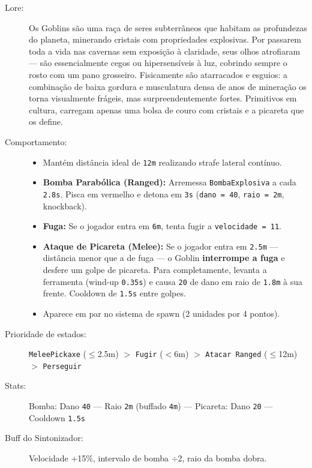 \documentclass[a4paper,12pt]{report}
\begin{document}
\begin{description}
    \item[Lore:] Os Goblins são uma raça de seres subterrâneos que habitam as profundezas do planeta, minerando cristais com propriedades explosivas. Por passarem toda a vida nas cavernas sem exposição à claridade, seus olhos atrofiaram --- são essencialmente cegos ou hipersensíveis à luz, cobrindo sempre o rosto com um pano grosseiro. Fisicamente são atarracados e esguios: a combinação de baixa gordura e musculatura densa de anos de mineração os torna visualmente frágeis, mas surpreendentemente fortes. Primitivos em cultura, carregam apenas uma bolsa de couro com cristais e a picareta que os define.
    \item[Comportamento:]
    \begin{itemize}
        \item Mantém distância ideal de \texttt{12m} realizando strafe lateral contínuo.
        \item \textbf{Bomba Parabólica (Ranged):} Arremessa \texttt{BombaExplosiva} a cada \texttt{2.8s}. Pisca em vermelho e detona em \texttt{3s} (\texttt{dano = 40}, \texttt{raio = 2m}, knockback).
        \item \textbf{Fuga:} Se o jogador entra em \texttt{6m}, tenta fugir a \texttt{velocidade = 11}.
        \item \textbf{Ataque de Picareta (Melee):} Se o jogador entra em \texttt{2.5m} --- distância menor que a de fuga --- o Goblin \textbf{interrompe a fuga} e desfere um golpe de picareta. Para completamente, levanta a ferramenta (wind-up \texttt{0.35s}) e causa \texttt{20} de dano em raio de \texttt{1.8m} à sua frente. Cooldown de \texttt{1.5s} entre golpes.
        \item Aparece em par no sistema de spawn (2 unidades por 4 pontos).
    \end{itemize}
    \item[Prioridade de estados:] \texttt{MeleePickaxe} ($\leq$2.5m) $>$ \texttt{Fugir} ($<$6m) $>$ \texttt{Atacar Ranged} ($\leq$12m) $>$ \texttt{Perseguir}
    \item[Stats:] Bomba: Dano \texttt{40} --- Raio \texttt{2m} (buffado \texttt{4m}) --- Picareta: Dano \texttt{20} --- Cooldown \texttt{1.5s}
    \item[Buff do Sintonizador:] Velocidade +15\%, intervalo de bomba $\div$2, raio da bomba dobra.
\end{description}

\end{document}
